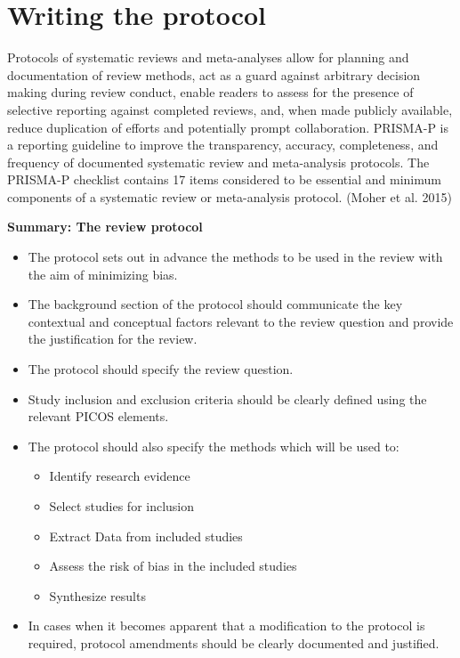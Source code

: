 \documentclass[
  11pt,
  a4paper,
  DIV=11,
  numbers=noendperiod]{scrreprt}
\begin{document}
\section{Writing the protocol}\label{writing-the-protocol}

Protocols of systematic reviews and meta-analyses allow for planning and
documentation of review methods, act as a guard against arbitrary
decision making during review conduct, enable readers to assess for the
presence of selective reporting against completed reviews, and, when
made publicly available, reduce duplication of efforts and potentially
prompt collaboration. PRISMA-P is a reporting guideline to improve the
transparency, accuracy, completeness, and frequency of documented
systematic review and meta-analysis protocols. The PRISMA-P checklist
contains 17 items considered to be essential and minimum components of a
systematic review or meta-analysis protocol. (Moher et al. 2015)

\textbf{Summary: The review protocol}

\begin{itemize}
\item
  The protocol sets out in advance the methods to be used in the review
  with the aim of minimizing bias.
\item
  The background section of the protocol should communicate the key
  contextual and conceptual factors relevant to the review question and
  provide the justification for the review.
\item
  The protocol should specify the review question.
\item
  Study inclusion and exclusion criteria should be clearly defined using
  the relevant PICOS elements.
\item
  The protocol should also specify the methods which will be used to:

  \begin{itemize}
  \item
    Identify research evidence
  \item
    Select studies for inclusion
  \item
    Extract Data from included studies
  \item
    Assess the risk of bias in the included studies
  \item
    Synthesize results
  \end{itemize}
\item
  In cases when it becomes apparent that a modification to the protocol
  is required, protocol amendments should be clearly documented and
  justified.
\end{itemize}
\end{document}
